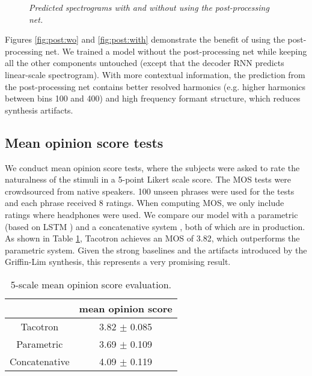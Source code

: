 \documentclass{article} \usepackage{iclr2017_conference,times}
\begin{document}
\begin{figure}[t]
\centering
{}
\caption{{\it Predicted spectrograms with and without using the post-processing net.}}
\label{fig:post}
\end{figure}

Figures \ref{fig:post:wo} and \ref{fig:post:with} demonstrate the benefit of using the post-processing net. We trained a model without the post-processing net while keeping all the other components untouched (except that the decoder RNN predicts linear-scale spectrogram). With more contextual information, the prediction from the post-processing net contains better resolved harmonics (e.g. higher harmonics between bins 100 and 400) and high frequency formant structure, which reduces synthesis artifacts.


\subsection{Mean opinion score tests}
\label{sec.mos}
We conduct mean opinion score tests, where the subjects were asked to rate the naturalness of the stimuli in a 5-point Likert scale score. The MOS tests were crowdsourced from native speakers. 100 unseen phrases were used for the tests and each phrase received 8 ratings. When computing MOS, we only include ratings where headphones were used. We compare our model with a parametric (based on LSTM \citep{zen2016fast}) and a concatenative system \citep{gonzalvo2016recent}, both of which are in production. As shown in Table \ref{tb.mos}, Tacotron achieves an MOS of 3.82, which outperforms the parametric system. Given the strong baselines and the artifacts introduced by the Griffin-Lim synthesis, this represents a very promising result.


\begin{table}[htp!]
\centering
\caption{5-scale mean opinion score evaluation.}
\label{tb.mos}
\begin{tabular}{c|c}
\hline
 & mean opinion score \\ \hline
Tacotron & 3.82  $\pm$ 0.085  \\ \hline
Parametric & 3.69 $\pm$ 0.109 \\ \hline
Concatenative & 4.09  $\pm$ 0.119 \\ \hline
\end{tabular}
\end{table}
\end{document}

